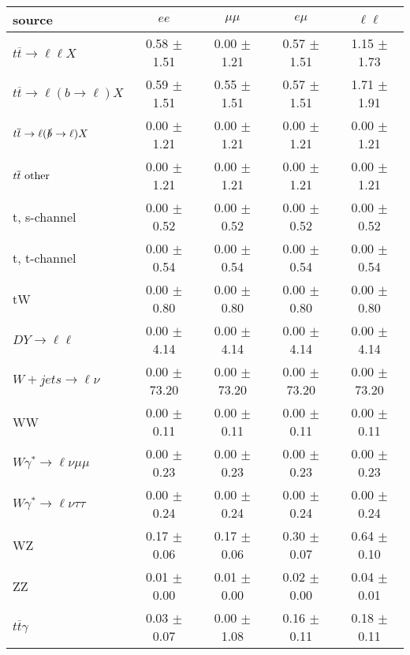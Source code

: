 \begin{tabular}{l|cccc} \hline\hline
source & $ee$ & $\mu\mu$ & $e\mu$ & $\ell\ell $ \\
\hline
$t\overline{t} \rightarrow \ell \ell X$ &  0.58 $\pm$  1.51 &  0.00 $\pm$  1.21 &  0.57 $\pm$  1.51 &  1.15 $\pm$  1.73 \\
$t\overline{t} \rightarrow \ell (b \rightarrow \ell) X$ &  0.59 $\pm$  1.51 &  0.55 $\pm$  1.51 &  0.57 $\pm$  1.51 &  1.71 $\pm$  1.91 \\
$t\overline{t} \rightarrow \ell (\slashed b \rightarrow \ell) X$ &  0.00 $\pm$  1.21 &  0.00 $\pm$  1.21 &  0.00 $\pm$  1.21 &  0.00 $\pm$  1.21 \\
        $t\overline{t}\ \rm{other}$ &  0.00 $\pm$  1.21 &  0.00 $\pm$  1.21 &  0.00 $\pm$  1.21 &  0.00 $\pm$  1.21 \\
\hline
                       t, s-channel &  0.00 $\pm$  0.52 &  0.00 $\pm$  0.52 &  0.00 $\pm$  0.52 &  0.00 $\pm$  0.52 \\
                       t, t-channel &  0.00 $\pm$  0.54 &  0.00 $\pm$  0.54 &  0.00 $\pm$  0.54 &  0.00 $\pm$  0.54 \\
                                 tW &  0.00 $\pm$  0.80 &  0.00 $\pm$  0.80 &  0.00 $\pm$  0.80 &  0.00 $\pm$  0.80 \\
\hline
         $DY \rightarrow \ell \ell$ &  0.00 $\pm$  4.14 &  0.00 $\pm$  4.14 &  0.00 $\pm$  4.14 &  0.00 $\pm$  4.14 \\
      $W+jets \rightarrow \ell \nu$ &  0.00 $\pm$ 73.20 &  0.00 $\pm$ 73.20 &  0.00 $\pm$ 73.20 &  0.00 $\pm$ 73.20 \\
                                 WW &  0.00 $\pm$  0.11 &  0.00 $\pm$  0.11 &  0.00 $\pm$  0.11 &  0.00 $\pm$  0.11 \\
\hline
$W\gamma^{*} \rightarrow \ell \nu \mu\mu$ &  0.00 $\pm$  0.23 &  0.00 $\pm$  0.23 &  0.00 $\pm$  0.23 &  0.00 $\pm$  0.23 \\
$W\gamma^{*} \rightarrow \ell \nu \tau\tau$ &  0.00 $\pm$  0.24 &  0.00 $\pm$  0.24 &  0.00 $\pm$  0.24 &  0.00 $\pm$  0.24 \\
                                 WZ &  0.17 $\pm$  0.06 &  0.17 $\pm$  0.06 &  0.30 $\pm$  0.07 &  0.64 $\pm$  0.10 \\
                                 ZZ &  0.01 $\pm$  0.00 &  0.01 $\pm$  0.00 &  0.02 $\pm$  0.00 &  0.04 $\pm$  0.01 \\
\hline
              $t\overline{t}\gamma$ &  0.03 $\pm$  0.07 &  0.00 $\pm$  1.08 &  0.16 $\pm$  0.11 &  0.18 $\pm$  0.11 \\

\end{tabular}
